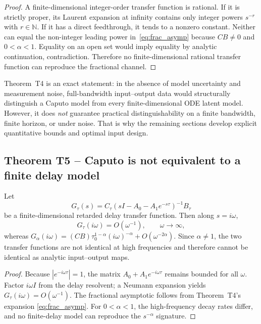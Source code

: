 \begin{proof}
A finite-dimensional integer-order transfer function is rational. If it is strictly proper, its Laurent expansion at infinity contains only integer powers \(s^{-r}\) with \(r \in \mathbb{N}\). If it has a direct feedthrough, it tends to a nonzero constant. Neither can equal the non-integer leading power in~\eqref{eq:frac_asymp} because \(CB \neq 0\) and \(0 < \alpha < 1\). Equality on an open set would imply equality by analytic continuation, contradiction. Therefore no finite-dimensional rational transfer function can reproduce the fractional channel.
\end{proof}

Theorem~T4 is an exact statement: in the absence of model uncertainty and measurement noise, full-bandwidth input--output data would structurally distinguish a Caputo model from every finite-dimensional ODE latent model. However, it does \emph{not} guarantee practical distinguishability on a finite bandwidth, finite horizon, or under noise. That is why the remaining sections develop explicit quantitative bounds and optimal input design.

\subsection{Theorem T5 -- Caputo is not equivalent to a finite delay model}

\begin{theorem}
\label{thm:T5}
Let
\[
G_\tau(s) = C_\tau(sI - A_0 - A_1 e^{-s\tau})^{-1} B_\tau
\]
be a finite-dimensional retarded delay transfer function. Then along \(s = i\omega\),
\[
G_\tau(i\omega) = O(\omega^{-1}),
\qquad \omega \to \infty,
\]
whereas \(G_\alpha(i\omega) = (CB)\tau_0^{1-\alpha}(i\omega)^{-\alpha} + O(\omega^{-2\alpha})\).
Since \(\alpha \neq 1\), the two transfer functions are not identical at high frequencies and therefore cannot be identical as analytic input--output maps.
\end{theorem}

\begin{proof}
Because \(|e^{-i\omega\tau}| = 1\), the matrix \(A_0 + A_1 e^{-i\omega\tau}\) remains bounded for all \(\omega\). Factor \(i\omega I\) from the delay resolvent; a Neumann expansion yields \(G_\tau(i\omega) = O(\omega^{-1})\). The fractional asymptotic follows from Theorem~T4's expansion \eqref{eq:frac_asymp}. For \(0 < \alpha < 1\), the high-frequency decay rates differ, and no finite-delay model can reproduce the \(s^{-\alpha}\) signature.
\end{proof}

